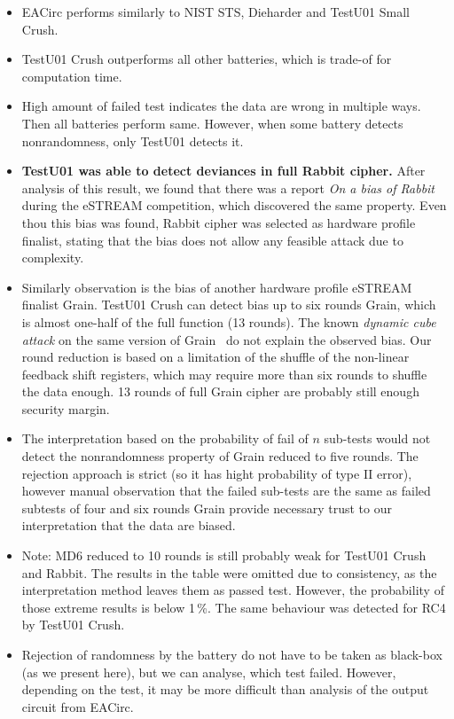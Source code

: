 \documentclass[
  print, %
  Table,   %
  nolof,     %
  nolot,     %
  11pt, %
  oneside  %
]{fithesis3}
\begin{document}
\begin{itemize}
    \item EACirc performs similarly to NIST STS, Dieharder and TestU01 Small Crush.
    \item TestU01 Crush outperforms all other batteries, which is trade-of for computation time.
    \item High amount of failed test indicates the data are wrong in multiple ways. Then all batteries perform same. However, when some battery detects nonrandomness, only TestU01 detects it.
    \item \textbf{TestU01 was able to detect deviances in full Rabbit cipher.} After analysis of this result, we found that there was a report \textit{On a bias of Rabbit}~\cite{aumasson2007bias} during the eSTREAM competition, which discovered the same property. Even thou this bias was found, Rabbit cipher was selected as hardware profile finalist, stating that the bias does not allow any feasible attack due to complexity.
    \item Similarly observation is the bias of another hardware profile eSTREAM finalist Grain. TestU01 Crush can detect bias up to six rounds Grain, which is almost one-half of the full function (13 rounds). The known \textit{dynamic cube attack} on the same version of Grain~\cite{dinur2011breaking} do not explain the observed bias. Our round reduction is based on a limitation of the shuffle of the non-linear feedback shift registers, which may require more than six rounds to shuffle the data enough. 13 rounds of full Grain cipher are probably still enough security margin.
    \item The interpretation based on the probability of fail of $n$ sub-tests would not detect the nonrandomness property of Grain reduced to five rounds. The rejection approach is strict (so it has hight probability of type II error), however manual observation that the failed sub-tests are the same as failed subtests of four and six rounds Grain provide necessary trust to our interpretation that the data are biased.
    \item Note: MD6 reduced to 10 rounds is still probably weak for TestU01 Crush and Rabbit. The results in the table were omitted due to consistency, as the interpretation method leaves them as passed test. However, the probability of those extreme results is below 1\,\%. The same behaviour was detected for RC4 by TestU01 Crush.
    \item Rejection of randomness by the battery do not have to be taken as black-box (as we present here), but we can analyse, which test failed. However, depending on the test, it may be more difficult than analysis of the output circuit from EACirc.


\end{itemize}
\end{document}
